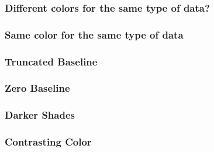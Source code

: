 \documentclass[12pt]{beamer}\usepackage[]{graphicx}\usepackage[]{color}
\begin{document}

\begin{frame}
\frametitle{Different colors for the same type of data?}
\begin{center}
\end{center}
\end{frame}


\begin{frame}
\frametitle{Same color for the same type of data}
\begin{center}
\end{center}
\end{frame}


\begin{frame}
\frametitle{Truncated Baseline}
\begin{center}
\end{center}
\end{frame}


\begin{frame}
\frametitle{Zero Baseline}
\begin{center}
\end{center}
\end{frame}


\begin{frame}
\frametitle{Darker Shades}
\begin{center}
\end{center}
\end{frame}


\begin{frame}
\frametitle{Contrasting Color}
\begin{center}
\end{center}
\end{frame}

\end{document}
